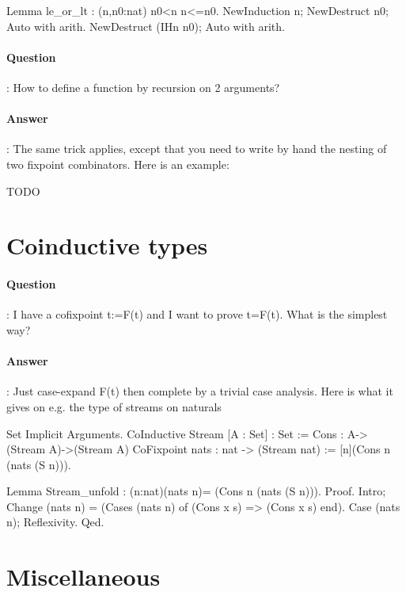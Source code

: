 \documentclass{article}
\begin{document}
\begin{coq_example}
Lemma le_or_lt : (n,n0:nat) n0<n \/ n<=n0.
NewInduction n; NewDestruct n0; Auto with arith.
NewDestruct (IHn n0); Auto with arith.
\end{coq_example}

\paragraph{Question}: How to define a function by recursion on 2 arguments?

\paragraph{Answer}: The same trick applies, except that you need to write by hand the nesting of two fixpoint combinators. Here is an example:

\begin{coq_example}
TODO
\end{coq_example}


\section{Coinductive types}

\paragraph{Question}: I have a cofixpoint t:=F(t) and I want to prove t=F(t). What is
the simplest way?

\paragraph{Answer}: Just case-expand F(t) then complete by a trivial case analysis.
Here is what it gives on e.g. the type of streams on naturals

\begin{coq_example}
  Set Implicit Arguments.
  CoInductive Stream [A : Set]  : Set := Cons : A->(Stream A)->(Stream A)
  CoFixpoint nats : nat -> (Stream nat) := [n](Cons n (nats (S n))).

  Lemma Stream_unfold : (n:nat)(nats n)= (Cons n (nats (S n))).
  Proof.
    Intro; Change (nats n) = (Cases (nats n) of (Cons x s) => (Cons x s) end).
    Case (nats n); Reflexivity.
  Qed.
\end{coq_example}

\section{Miscellaneous}
\end{document}
